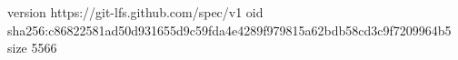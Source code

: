 version https://git-lfs.github.com/spec/v1
oid sha256:c86822581ad50d931655d9c59fda4e4289f979815a62bdb58cd3c9f7209964b5
size 5566
